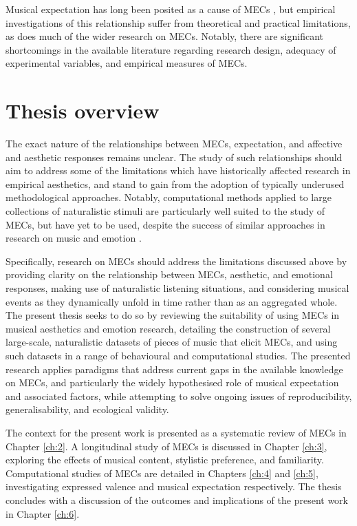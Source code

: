 Musical expectation has long been posited as a cause of MECs \parencite{harrison2014, huron2006, huron2010, juslin2013, juslin2008, mcdermott2012, mencke2019, pearce2012, salimpoor2011, sloboda1991}, but empirical investigations of this relationship suffer from theoretical and practical limitations, as does much of the wider research on MECs. Notably, there are significant shortcomings in the available literature regarding research design, adequacy of experimental variables, and empirical measures of MECs.

\section{Thesis overview}

The exact nature of the relationships between MECs, expectation, and affective and aesthetic responses remains unclear. The study of such relationships should aim to address some of the limitations which have historically affected research in empirical aesthetics, and stand to gain from the adoption of typically underused methodological approaches. Notably, computational methods applied to large collections of naturalistic stimuli are particularly well suited to the study of MECs, but have yet to be used, despite the success of similar approaches in research on music and emotion \parencite[e.g.,][]{eerola2011}.

Specifically, research on MECs should address the limitations discussed above by providing clarity on the relationship between MECs, aesthetic, and emotional responses, making use of naturalistic listening situations, and considering musical events as they dynamically unfold in time rather than as an aggregated whole. The present thesis seeks to do so by reviewing the suitability of using MECs in musical aesthetics and emotion research, detailing the construction of several large-scale, naturalistic datasets of pieces of music that elicit MECs, and using such datasets in a range of behavioural and computational studies. The presented research applies paradigms that address current gaps in the available knowledge on MECs, and particularly the widely hypothesised role of musical expectation and associated factors, while attempting to solve ongoing issues of reproducibility, generalisability, and ecological validity.

The context for the present work is presented as a systematic review of MECs in Chapter \ref{ch:2}. A longitudinal study of MECs is discussed in Chapter \ref{ch:3}, exploring the effects of musical content, stylistic preference, and familiarity. Computational studies of MECs are detailed in Chapters \ref{ch:4} and \ref{ch:5}, investigating expressed valence and musical expectation respectively. The thesis concludes with a discussion of the outcomes and implications of the present work in Chapter \ref{ch:6}.
